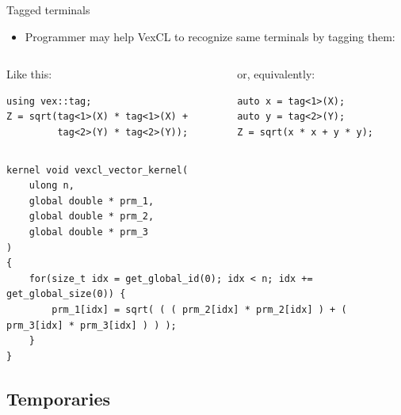 \documentclass[@BEAMER_OPTIONS@]{beamer}
\begin{document}
\begin{frame}[fragile]{Tagged terminals}
    \begin{itemize}
        \item Programmer may help VexCL to recognize same terminals by
            tagging them:
    \end{itemize}
    \begin{columns}
        \begin{column}{0.48\textwidth}
            \begin{exampleblock}{Like this:}
                \begin{lstlisting}
using vex::tag;
Z = sqrt(tag<1>(X) * tag<1>(X) +
         tag<2>(Y) * tag<2>(Y));
                \end{lstlisting}
            \end{exampleblock}
        \end{column}
        \begin{column}{0.48\textwidth}
            \begin{exampleblock}{or, equivalently:}
                \begin{lstlisting}
auto x = tag<1>(X);
auto y = tag<2>(Y);
Z = sqrt(x * x + y * y);
                \end{lstlisting}
            \end{exampleblock}
        \end{column}
    \end{columns}
    \begin{exampleblock}{}
        \begin{lstlisting}
kernel void vexcl_vector_kernel(
    ulong n,
    global double * prm_1,
    global double * prm_2,
    global double * prm_3
)
{
    for(size_t idx = get_global_id(0); idx < n; idx += get_global_size(0)) {
        prm_1[idx] = sqrt( ( ( prm_2[idx] * prm_2[idx] ) + ( prm_3[idx] * prm_3[idx] ) ) );
    }
}
        \end{lstlisting}
    \end{exampleblock}
\end{frame}

\note{ }

\subsection{Temporaries}
\end{document}
